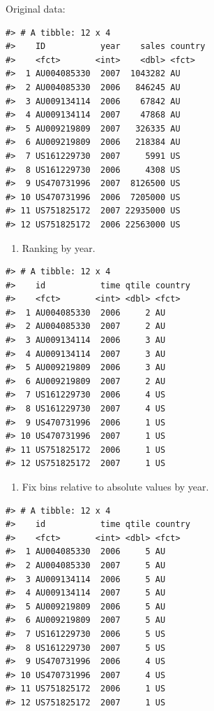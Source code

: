 Original data:

\begin{verbatim}
#> # A tibble: 12 x 4
#>    ID           year    sales country
#>    <fct>       <int>    <dbl> <fct>  
#>  1 AU004085330  2007  1043282 AU     
#>  2 AU004085330  2006   846245 AU     
#>  3 AU009134114  2006    67842 AU     
#>  4 AU009134114  2007    47868 AU     
#>  5 AU009219809  2007   326335 AU     
#>  6 AU009219809  2006   218384 AU     
#>  7 US161229730  2007     5991 US     
#>  8 US161229730  2006     4308 US     
#>  9 US470731996  2007  8126500 US     
#> 10 US470731996  2006  7205000 US     
#> 11 US751825172  2007 22935000 US     
#> 12 US751825172  2006 22563000 US
\end{verbatim}

\begin{enumerate}
\def\labelenumi{\arabic{enumi}.}
\tightlist
\item
  Ranking by year.
\end{enumerate}

\begin{verbatim}
#> # A tibble: 12 x 4
#>    id           time qtile country
#>    <fct>       <int> <dbl> <fct>  
#>  1 AU004085330  2006     2 AU     
#>  2 AU004085330  2007     2 AU     
#>  3 AU009134114  2006     3 AU     
#>  4 AU009134114  2007     3 AU     
#>  5 AU009219809  2006     3 AU     
#>  6 AU009219809  2007     2 AU     
#>  7 US161229730  2006     4 US     
#>  8 US161229730  2007     4 US     
#>  9 US470731996  2006     1 US     
#> 10 US470731996  2007     1 US     
#> 11 US751825172  2006     1 US     
#> 12 US751825172  2007     1 US
\end{verbatim}

\begin{enumerate}
\def\labelenumi{\arabic{enumi}.}
\setcounter{enumi}{1}
\tightlist
\item
  Fix bins relative to absolute values by year.
\end{enumerate}

\begin{verbatim}
#> # A tibble: 12 x 4
#>    id           time qtile country
#>    <fct>       <int> <dbl> <fct>  
#>  1 AU004085330  2006     5 AU     
#>  2 AU004085330  2007     5 AU     
#>  3 AU009134114  2006     5 AU     
#>  4 AU009134114  2007     5 AU     
#>  5 AU009219809  2006     5 AU     
#>  6 AU009219809  2007     5 AU     
#>  7 US161229730  2006     5 US     
#>  8 US161229730  2007     5 US     
#>  9 US470731996  2006     4 US     
#> 10 US470731996  2007     4 US     
#> 11 US751825172  2006     1 US     
#> 12 US751825172  2007     1 US
\end{verbatim}

